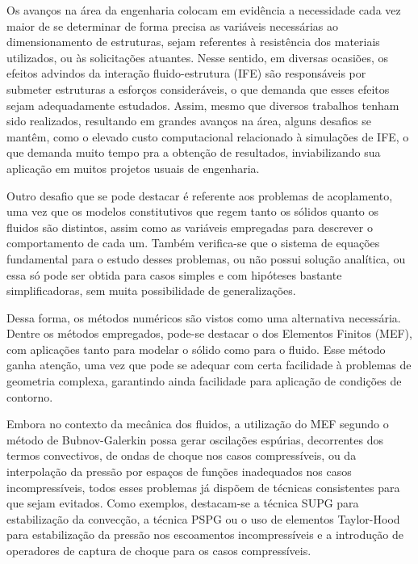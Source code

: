Os avanços na área da engenharia colocam em evidência a necessidade cada vez maior de se determinar de forma precisa as variáveis necessárias ao dimensionamento de estruturas, sejam referentes à resistência dos materiais utilizados, ou às solicitações atuantes. Nesse sentido, em diversas ocasiões, os efeitos advindos da interação fluido-estrutura (IFE) são responsáveis por submeter estruturas a esforços consideráveis, o que demanda que esses efeitos sejam adequadamente estudados. Assim, mesmo que diversos trabalhos tenham sido realizados, resultando em grandes avanços na área, alguns desafios se mantêm, como o elevado custo computacional relacionado à simulações de IFE, o que demanda muito tempo pra a obtenção de resultados, inviabilizando sua aplicação em muitos projetos usuais de engenharia.

Outro desafio que se pode destacar é referente aos problemas de acoplamento, uma vez que os modelos constitutivos que regem tanto os sólidos quanto os fluidos são distintos, assim como as variáveis empregadas para descrever o comportamento de cada um. Também verifica-se que o sistema de equações fundamental para o estudo desses problemas, ou não possui solução analítica, ou essa só pode ser obtida para casos simples e com hipóteses bastante simplificadoras, sem muita possibilidade de generalizações.

Dessa forma, os métodos numéricos são vistos como uma alternativa necessária. Dentre os métodos empregados, pode-se destacar o dos Elementos Finitos (MEF), com aplicações tanto para modelar o sólido como para o fluido. Esse método ganha atenção, uma vez que pode se adequar com certa facilidade à problemas de geometria complexa, garantindo ainda facilidade para aplicação de condições de contorno.

Embora no contexto da mecânica dos fluidos, a utilização do MEF segundo o método de Bubnov-Galerkin possa gerar oscilações espúrias, decorrentes dos termos convectivos, de ondas de choque nos casos compressíveis, ou da interpolação da pressão por espaços de funções inadequados nos casos incompressíveis, todos esses problemas já dispõem de técnicas consistentes para que sejam evitados. Como exemplos, destacam-se a técnica SUPG para estabilização da convecção, a técnica PSPG ou o uso de elementos Taylor-Hood para estabilização da pressão nos escoamentos incompressíveis e a introdução de operadores de captura de choque para os casos compressíveis.


